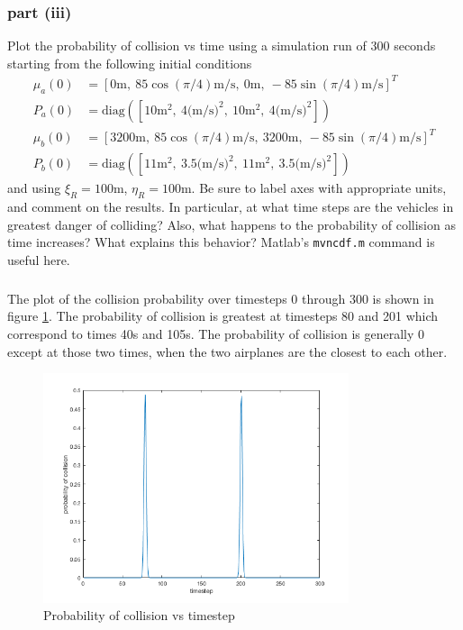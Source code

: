 \documentclass[11pt]{article}
\begin{document}
\subsubsection*{part (iii)}
Plot the probability of collision vs time using a simulation run of 300 seconds starting from the following initial conditions
\begin{align*}
	\mu_a(0) &= [0\text{m},\ 85\cos(\pi/4)\text{m/s},\ 0\text{m},\ -85\sin(\pi/4)\text{m/s}]^T \\
	P_a(0) &= \text{diag}([10\text{m}^2,\ 4\text{(m/s)}^2,\ 10\text{m}^2,\ 4\text{(m/s)}^2]) \\
	\mu_b(0) &= [3200\text{m},\ 85\cos(\pi/4)\text{m/s},\ 3200\text{m},\ -85\sin(\pi/4)\text{m/s}]^T \\
	P_b(0) &= \text{diag}([11\text{m}^2,\ 3.5\text{(m/s)}^2,\ 11\text{m}^2,\ 3.5\text{(m/s)}^2])
\end{align*}
and using $\xi_R=100$m, $\eta_R=100$m. Be sure to label axes with appropriate units, and comment on the results. In particular, at what time steps are the vehicles in greatest danger of colliding? Also, what happens to the probability of collision as time increases? What explains this behavior? Matlab's \texttt{mvncdf.m} command is useful here.

\subparagraph*{}
The plot of the collision probability over timesteps 0 through 300 is shown in figure \ref{Pc}. The probability of collision is greatest at timesteps 80 and 201 which correspond to times 40s and 105s. The probability of collision is generally 0 except at those two times, when the two airplanes are the closest to each other.

\begin{figure}[h]
	\centering
	\includegraphics[width=0.8\textwidth]{p1_plt9.png}
	\caption{Probability of collision vs timestep}
	\label{Pc}
\end{figure}
\end{document}
